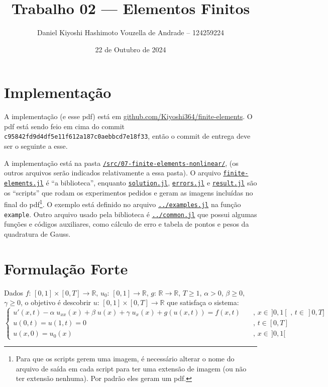 \documentclass[a4paper]{article}
\title{Trabalho 02 --- Elementos Finitos}
\author{Daniel Kiyoshi Hashimoto Vouzella de Andrade -- 124259224}
\date{22 de Outubro de 2024}
\newcommand{\linkfileraw}[2]{\href{run:../../#1}{\texttt{#2}}}
\newcommand{\linkfile}[2][src/05-finite-elements-gamma/]{\linkfileraw{#1#2}{#2}}
\newcommand{\typ}{:\,}
\begin{document}
\maketitle

\setcounter{section}{-1}
\section{Implementação}

A implementação (e esse pdf) está em
\href{https://github.com/Kiyoshi364/finite-elements}{github.com/Kiyoshi364/finite-elements}.
O pdf está sendo feio em cima do commit
\texttt{c95842fd9d4df5e11f612a187c0aebbcd7e18f33},
então o commit de entrega deve ser o seguinte a esse.

A implementação está na pasta
\linkfileraw{/src/07-finite-elements-nonlinear/}{/src/07-finite-elements-nonlinear/},
(os outros arquivos serão indicados
relativamente a essa pasta).
O arquivo \linkfile{finite-elements.jl}
é ``a biblioteca'',
enquanto
\linkfile{solution.jl}, \linkfile{errors.jl}
e \linkfile{result.jl}
são os ``scripts'' que rodam os experimentos pedidos
e geram as imagens incluídas no final do pdf\footnote{
Para que os scripts gerem uma imagem,
é necessário alterar o nome do arquivo de saída
em cada script para ter uma extensão de imagem
(ou não ter extensão nenhuma).
Por padrão eles geram um pdf.
}.
O exemplo está definido
no arquivo
\linkfile{../examples.jl}
na função \texttt{example}.
Outro arquivo usado pela biblioteca é
\linkfile{../common.jl}
que possui algumas funções e códigos auxiliares,
como cálculo de erro e
tabela de pontos e pesos da quadratura de Gauss.

\section{Formulação Forte}

Dados
\(f \typ [0, 1] \times [0, T] \to \mathbb{R}\),
\(u_0 \typ [0, 1] \to \mathbb{R}\),
\(g \typ \mathbb{R} \to \mathbb{R}\),
\(T \ge 1\),
\(\alpha > 0\),
\(\beta \ge 0\),
\(\gamma \ge 0\),
o objetivo é descobrir \(u \typ [0, 1] \times [0, T] \to \mathbb{R}\)
que satisfaça o sistema:
\[ \begin{cases}
    u'(x, t) - \alpha \; u_{xx}(x) + \beta \; u(x) + \gamma \; u_{x}(x) + g(u(x, t))= f(x, t)
        &\quad\text{, } x \in \,]0, 1[ \text{ , } t \in \,]0, T]
    \\
    u(0, t) = u(1, t) = 0
        &\quad\text{, } t \in [0, T]
    \\
    u(x, 0) = u_0(x)
        &\quad\text{, } x \in \,]0, 1[
\end{cases} \]
\end{document}
